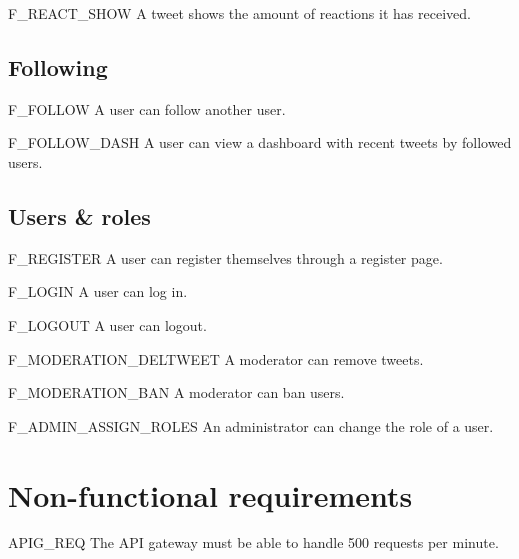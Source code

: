 \begin{tereqdef}{F_REACT_SHOW}
    A tweet shows the amount of reactions it has received.
\end{tereqdef}

\subsection{Following}

\begin{tereqdef}{F_FOLLOW}
    A user can follow another user.
\end{tereqdef}

\begin{tereqdef}{F_FOLLOW_DASH}
    A user can view a dashboard with recent tweets by followed users.
\end{tereqdef}

\subsection{Users \& roles}

\begin{tereqdef}{F_REGISTER}
    A user can register themselves through a register page.
\end{tereqdef}

\begin{tereqdef}{F_LOGIN}
    A user can log in.
\end{tereqdef}

\begin{tereqdef}{F_LOGOUT}
    A user can logout.
\end{tereqdef}

\begin{tereqdef}{F_MODERATION_DELTWEET}
    A moderator can remove tweets.
\end{tereqdef}

\begin{tereqdef}{F_MODERATION_BAN}
    A moderator can ban users.
\end{tereqdef}

\begin{tereqdef}{F_ADMIN_ASSIGN_ROLES}
    An administrator can change the role of a user.
\end{tereqdef}

\section{Non-functional requirements}

\begin{tereqdef}{APIG_REQ}
    The API gateway must be able to handle 500 requests per minute.
\end{tereqdef}